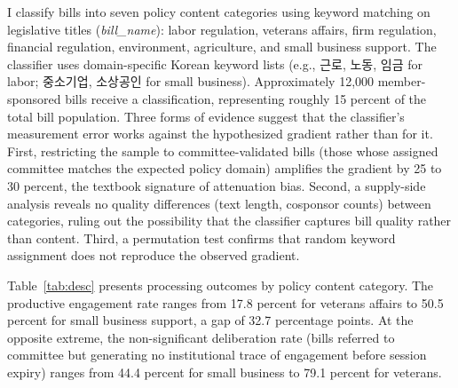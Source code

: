 \documentclass[11pt]{article}
\begin{document}
I classify bills into seven policy content categories using keyword matching on legislative titles (\textit{bill\_name}): labor regulation, veterans affairs, firm regulation, financial regulation, environment, agriculture, and small business support. The classifier uses domain-specific Korean keyword lists (e.g., 근로, 노동, 임금 for labor; 중소기업, 소상공인 for small business). Approximately 12,000 member-sponsored bills receive a classification, representing roughly 15 percent of the total bill population. Three forms of evidence suggest that the classifier's measurement error works against the hypothesized gradient rather than for it. First, restricting the sample to committee-validated bills (those whose assigned committee matches the expected policy domain) amplifies the gradient by 25 to 30 percent, the textbook signature of attenuation bias. Second, a supply-side analysis reveals no quality differences (text length, cosponsor counts) between categories, ruling out the possibility that the classifier captures bill quality rather than content. Third, a permutation test confirms that random keyword assignment does not reproduce the observed gradient.

Table~\ref{tab:desc} presents processing outcomes by policy content category. The productive engagement rate ranges from 17.8 percent for veterans affairs to 50.5 percent for small business support, a gap of 32.7 percentage points. At the opposite extreme, the non-significant deliberation rate (bills referred to committee but generating no institutional trace of engagement before session expiry) ranges from 44.4 percent for small business to 79.1 percent for veterans.
\end{document}
